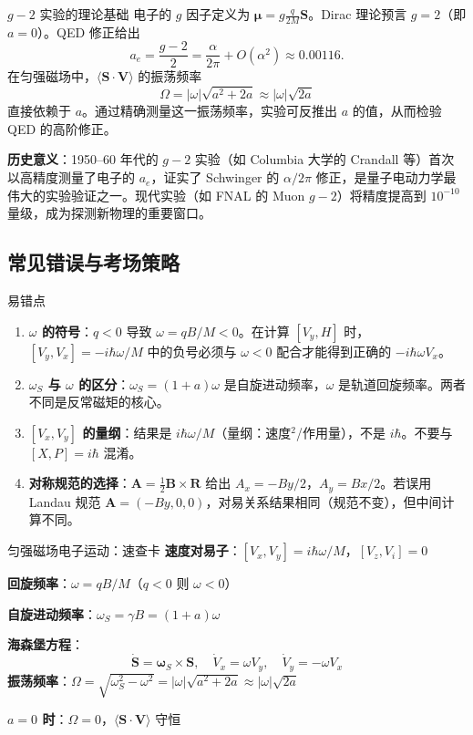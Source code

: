 \begin{insightbox}{$g-2$ 实验的理论基础}
电子的 $g$ 因子定义为 $\bm\mu = g\frac{q}{2M}\bm S$。Dirac 理论预言 $g=2$（即 $a=0$）。QED 修正给出
\[
  a_e = \frac{g-2}{2} = \frac{\alpha}{2\pi} + O(\alpha^2) \approx 0.00116.
\]
在匀强磁场中，$\langle\bm S\cdot\bm V\rangle$ 的振荡频率
\[
  \Omega = |\omega|\sqrt{a^2+2a} \approx |\omega|\sqrt{2a}
\]
直接依赖于 $a$。通过精确测量这一振荡频率，实验可反推出 $a$ 的值，从而检验 QED 的高阶修正。

\textbf{历史意义}：1950--60 年代的 $g-2$ 实验（如 Columbia 大学的 Crandall 等）首次以高精度测量了电子的 $a_e$，证实了 Schwinger 的 $\alpha/2\pi$ 修正，是量子电动力学最伟大的实验验证之一。现代实验（如 FNAL 的 Muon $g-2$）将精度提高到 $10^{-10}$ 量级，成为探测新物理的重要窗口。
\end{insightbox}


\subsection{常见错误与考场策略}

\begin{errorbox}{易错点}
\begin{enumerate}
  \item \textbf{$\omega$ 的符号}：$q<0$ 导致 $\omega=qB/M<0$。在计算 $[V_y,H]$ 时，$[V_y,V_x]=-i\hbar\omega/M$ 中的负号必须与 $\omega<0$ 配合才能得到正确的 $-i\hbar\omega V_x$。
  \item \textbf{$\omega_S$ 与 $\omega$ 的区分}：$\omega_S=(1+a)\omega$ 是自旋进动频率，$\omega$ 是轨道回旋频率。两者不同是反常磁矩的核心。
  \item \textbf{$[V_x,V_y]$ 的量纲}：结果是 $i\hbar\omega/M$（量纲：速度$^2$/作用量），不是 $i\hbar$。不要与 $[X,P]=i\hbar$ 混淆。
  \item \textbf{对称规范的选择}：$\bm A=\frac12\bm B\times\bm R$ 给出 $A_x=-By/2$，$A_y=Bx/2$。若误用 Landau 规范 $\bm A=(-By,0,0)$，对易关系结果相同（规范不变），但中间计算不同。
\end{enumerate}
\end{errorbox}

\begin{cheatbox}{匀强磁场电子运动：速查卡}
\textbf{速度对易子}：$[V_x,V_y]=i\hbar\omega/M$，$[V_z,V_i]=0$

\textbf{回旋频率}：$\omega=qB/M$（$q<0$ 则 $\omega<0$）

\textbf{自旋进动频率}：$\omega_S=\gamma B=(1+a)\omega$

\textbf{海森堡方程}：
\[
  \dot{\bm S}=\bm\omega_S\times\bm S,\quad \dot V_x=\omega V_y,\quad \dot V_y=-\omega V_x
\]
\textbf{振荡频率}：$\Omega=\sqrt{\omega_S^2-\omega^2}=|\omega|\sqrt{a^2+2a}\approx|\omega|\sqrt{2a}$

\textbf{$a=0$ 时}：$\Omega=0$，$\langle\bm S\cdot\bm V\rangle$ 守恒
\end{cheatbox}

